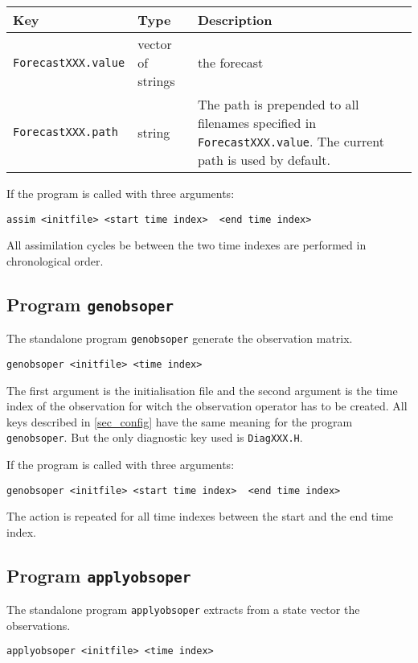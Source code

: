 \documentclass[a4paper,12pt]{article}
\newcommand{\code}{\texttt}
\newenvironment{keytabular}{\begin{tabular}{|p{0.3\textwidth}|p{0.2\textwidth}|p{0.5\textwidth}|} \hline Key & Type & Description \\ \hline \hline }{\end{tabular}}
\begin{document}
\begin{keytabular}
\code{ForecastXXX.value} & vector of strings & the forecast
\\
\code{ForecastXXX.path} & string &  The path is prepended to all filenames
specified in \code{ForecastXXX.value}. The current path is used by default.
\\
\hline
\end{keytabular}

If the program is called with three arguments:

\begin{verbatim}
assim <initfile> <start time index>  <end time index>
\end{verbatim}

All assimilation cycles be between the two time indexes are performed in chronological order.

\subsection{Program \code{genobsoper}}

The standalone program \code{genobsoper} generate the observation matrix.

\begin{verbatim}
genobsoper <initfile> <time index>
\end{verbatim}

The first argument is the initialisation file and the second argument is the time index of the observation for witch the observation operator has to be created. All keys described in \ref{sec_config} have the same meaning for the program \code{genobsoper}. But the only diagnostic key used is \code{DiagXXX.H}.

If the program is called with three arguments:

\begin{verbatim}
genobsoper <initfile> <start time index>  <end time index>
\end{verbatim}

The action is repeated for all time indexes between the start and the end time index.

\subsection{Program \code{applyobsoper}}

The standalone program \code{applyobsoper} extracts from a state vector the observations.

\begin{verbatim}
applyobsoper <initfile> <time index>
\end{verbatim}
\end{document}
